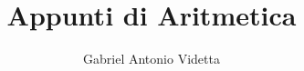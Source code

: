 \documentclass[oneside]{book}
\theoremstyle{definition}
\begin{document}
\author{Gabriel Antonio Videtta}
\title{Appunti di Aritmetica}

\maketitle
\newpage

\tableofcontents
\newpage



\end{document}

